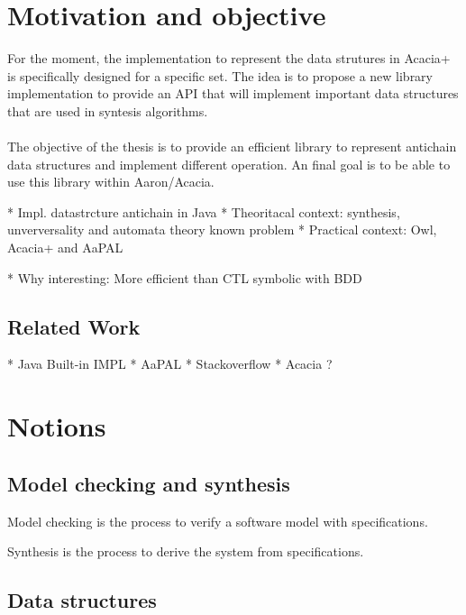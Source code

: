 \documentclass[letterpaper]{memoir}
\begin{document}

\section{Motivation and objective}

For the moment, the implementation to represent the data strutures in
 Acacia+
is specifically designed for a specific set. The idea is to propose a new
library implementation to provide an API that will implement important
data structures that are used in syntesis algorithms.

\paragraph{}

The objective of the thesis is to provide an efficient library to represent
antichain data structures and implement different operation. An final
goal is to be able to use this library within Aaron/Acacia.


* Impl. datastrcture antichain in Java
* Theoritacal context: synthesis,
unverversality and automata theory known problem
* Practical context: Owl, Acacia+ and AaPAL

* Why interesting: More efficient than CTL symbolic with BDD

\subsection{Related Work}

* Java Built-in IMPL
* AaPAL
* Stackoverflow
* Acacia ?

\section{Notions}

\subsection{Model checking and synthesis}

Model checking is the process to verify a software model with
specifications.

Synthesis is the process to derive the system from specifications.

\cite{bohyphd}

\cite{ltl_rea}
\subsection{Data structures}
\end{document}
